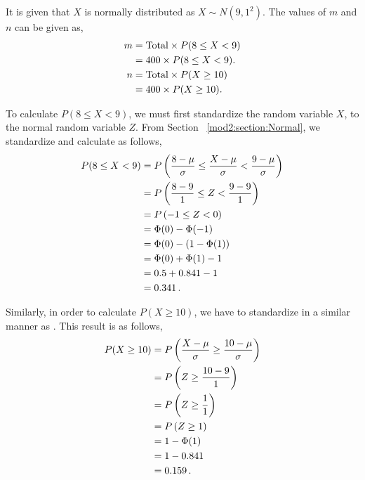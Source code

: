 \begin{subquestions}
\subquestion

\begin{subsubquestions}
	
\subsubquestion

It is given that $X$ is normally distributed as $X \sim N(9,1^2)$. The values of $m$ and $n$ can be given as,
\begin{align}
	m & = \text{Total} \times P(8 \leq X < 9) \nonumber \\
	  & = 400 \times P(8 \leq X < 9). \nonumber \\
    n & = \text{Total} \times P(X \geq 10) \nonumber \\
      & = 400 \times P(X \geq 10). \label{2015:q4:MNeqn}
\end{align}
	
To calculate $P(8 \leq X < 9)$, we must first standardize the random variable $X$, to the normal random variable $Z$. From Section ~\ref{mod2:section:Normal}, we standardize and calculate as follows,
\begin{align}
	P(8 \leq X < 9) & = P\left(\frac{8- \mu}{\sigma} \leq \frac{X-\mu}{\sigma} < \frac{9-\mu}{\sigma} \right) \nonumber \\
	                & = P\left(\frac{8- 9}{1} \leq Z < \frac{9-9}{1} \right) \nonumber \\
	                & = P\left(-1 \leq Z < 0 \right) \nonumber \\
	                & = \Phi(0) - \Phi(-1) \nonumber \\
	                & = \Phi(0) - (1 - \Phi(1)) \nonumber \\
	                & = \Phi(0) + \Phi(1) - 1 \nonumber \\
	                & = 0.5 + 0.841 - 1 \nonumber \\
	                & = 0.341 \,. \label{2015:q4:Normal1}
\end{align}

Similarly, in order to calculate $P(X \geq 10)$, we have to standardize in a similar manner as . This result is as follows,
\begin{align}
	P(X \geq 10) & = P\left(\frac{X-\mu}{\sigma} \geq \frac{10 - \mu}{\sigma} \right) \nonumber \\
	             & = P\left(Z \geq \frac{10-9}{1}\right) \nonumber \\
	             & = P\left(Z \geq \frac{1}{1}\right) \nonumber \\
	             & = P\left(Z \geq 1\right) \nonumber \\
	             & = 1 - \Phi(1) \nonumber \\
	             & = 1 - 0.841 \nonumber \\
	             & = 0.159 \,. \label{2015:q4:Normal2}
\end{align}


\end{subsubquestions}
\end{subquestions}
